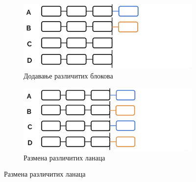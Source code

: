 \documentclass[12pt, a4paper]{article}
\begin{document}
\begin{figure}[h]
    \centering
    \begin{subfigure}{0.45\linewidth}
        \includegraphics[width=\linewidth]{slike/forks-1.png}
        \caption{Додавање различитих блокова}
        \label{fig:forks-a}
    \end{subfigure}
    \hfill
    \begin{subfigure}{0.45\linewidth}
        \includegraphics[width=\linewidth]{slike/forks-2.png}
        \caption{Размена различитих ланаца}
        \label{fig:forks-b}
    \end{subfigure}


\end{figure}
\end{document}
